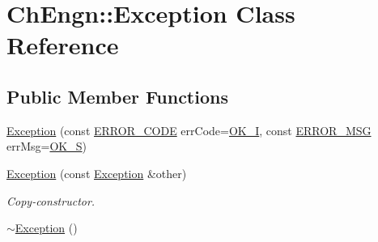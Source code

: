 \hypertarget{classChEngn_1_1Exception}{
\section{ChEngn::Exception Class Reference}
\label{classChEngn_1_1Exception}
}
\subsection*{Public Member Functions}
\begin{DoxyCompactItemize}
\item 
\hyperlink{classChEngn_1_1Exception_af59b66bd5a147479869c9df081f0c53f}{Exception} (const \hyperlink{namespaceChEngn_a347ab4e4a29f725ed0253d8311c82233}{ERROR\_\-CODE} errCode=\hyperlink{namespaceChEngn_a58f231c1008467b4b6cfb17b190293a5}{OK\_\-I}, const \hyperlink{namespaceChEngn_a01b85c98a5b00144710f14c2e5c11656}{ERROR\_\-MSG} errMsg=\hyperlink{namespaceChEngn_a669b96f20597d4a0b00d4c9e4db68ee8}{OK\_\-S})
\item 
\hypertarget{classChEngn_1_1Exception_a5f404e2a9925706a99d8796e65d2a1cc}{
\hyperlink{classChEngn_1_1Exception_a5f404e2a9925706a99d8796e65d2a1cc}{Exception} (const \hyperlink{classChEngn_1_1Exception}{Exception} \&other)}
\label{classChEngn_1_1Exception_a5f404e2a9925706a99d8796e65d2a1cc}

\begin{DoxyCompactList}\small\item\em Copy-\/constructor. \item\end{DoxyCompactList}\item 
\hypertarget{classChEngn_1_1Exception_a6fc50135102ba663b36673ad855c483f}{
\hyperlink{classChEngn_1_1Exception_a6fc50135102ba663b36673ad855c483f}{$\sim$Exception} ()}
\label{classChEngn_1_1Exception_a6fc50135102ba663b36673ad855c483f}


\end{DoxyCompactItemize}
